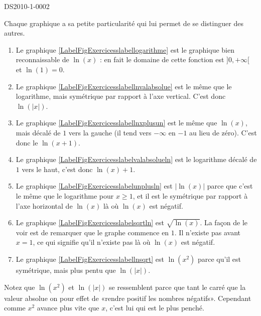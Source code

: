
\begin{corrige}{DS2010-1-0002}

	Chaque graphique a sa petite particularité qui lui permet de se distinguer des autres.
	\begin{enumerate}
		\item
			Le graphique \ref{LabelFigExercicesslabellogarithme} est le graphique bien reconnaissable de $\ln(x)$ : en fait le domaine de cette fonction est $]0, +\infty[$ et $\ln (1)=0$.
		\item
			Le graphique \ref{LabelFigExercicesslabellnvalabsolue} est le même que le logarithme, mais symétrique par rapport à l'axe vertical. C'est donc $\ln(| x |)$.
		\item
			Le graphique \ref{LabelFigExercicesslabellnxplusun} est le même que $\ln(x)$, mais décalé de $1$ vers la gauche (il tend vers $-\infty$ en $-1$ au lieu de zéro). C'est donc le $\ln(x+1)$.
		\item
			Le graphique \ref{LabelFigExercicesslabelvalabsolueln} est le logarithme décalé de $1$ vers le haut, c'est donc $\ln(x)+1$.
		\item
			Le graphique \ref{LabelFigExercicesslabelunplusln} est $| \ln(x) |$ parce que c'est le même que le logarithme pour $x\geq 1$, et il est le symétrique par rapport à l'axe horizontal de $\ln(x)$ là où $\ln(x)$ est négatif.
		\item
			Le graphique \ref{LabelFigExercicesslabelsqrtln} est $\sqrt{\ln(x)}$. La façon de le voir est de remarquer que le graphe commence en $1$. Il n'existe pas avant $x=1$, ce qui signifie qu'il n'existe pas là où $\ln(x)$ est négatif.
		\item
			Le graphique \ref{LabelFigExercicesslabellnsqrt} est $\ln(x^2)$ parce qu'il est symétrique, mais plus pentu que $\ln(| x |)$.
			
	\end{enumerate}
	Notez que $\ln(x^2)$ et $\ln(| x |)$ se ressemblent parce que tant le carré que la valeur absolue on pour effet de «rendre positif les nombres négatifs». Cependant comme $x^2$ avance plus vite que $x$, c'est lui qui est le plus penché.

\end{corrige}
